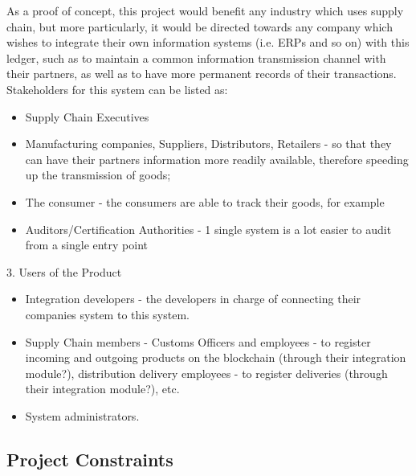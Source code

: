 	As a proof of concept, this project would benefit any industry which uses supply chain, but more particularly, it would be directed towards any company which wishes to integrate their own information systems (i.e. ERPs and so on) with this ledger, such as to maintain a common information transmission channel with their partners, as well as to have more permanent records of their transactions. Stakeholders for this system can be listed as:
    \begin{itemize}
		\item Supply Chain Executives
			\item Manufacturing companies, Suppliers, Distributors, Retailers - so that they can have their partners information more readily available, therefore speeding up the transmission of goods;
		\item The consumer - the consumers are able to track their goods, for example
		\item Auditors/Certification Authorities - 1 single system is a lot easier to audit from a single entry point
	\end{itemize}
	3. Users of the Product
		\begin{itemize}
		\item Integration developers - the developers in charge of connecting their companies system to this system.
		\item Supply Chain members - Customs Officers and employees - to register incoming and outgoing products on the blockchain (through their integration module?), distribution delivery employees - to register deliveries (through their integration module?), etc.
		\item System administrators.
	\end{itemize}

\subsection{Project Constraints}

